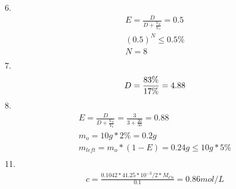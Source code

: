 \documentclass{article}
\begin{document}
6.\begin{equation}
    \begin{multlined}
        E = \frac{D}{D+\frac{V_w}{V_o}} = 0.5\\
        (0.5)^N\leq0.5\%\\
        N = 8\\
    \end{multlined}
\end{equation}
7.\begin{equation}
    D = \frac{83\%}{17\%} = 4.88\\
\end{equation}
8.\begin{equation}
    \begin{multlined}
        E = \frac{D}{D+\frac{V_w}{V_o}} = \frac{3}{3+\frac{20}{50}} = 0.88\\
        m_o = 10g*2\% = 0.2g\\
        m_{left} = m_o*(1-E) = 0.24g \leq 10g*5\%\\
    \end{multlined}
\end{equation}
11.\begin{equation}
    \begin{multlined}
        c = \frac{0.1042*41.25*10^{-3}/2*M_{Ca}}{0.1} = 0.86 mol/L\\
    \end{multlined}
\end{equation}
\end{document}
